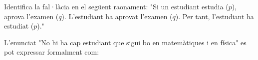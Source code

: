 \begin{enumerate}
\begin{enumerate}
\end{enumerate}
\feedback

\pregunta Identifica la fal·làcia en el següent
raonament: "Si un estudiant estudia ($p$), aprova l'examen ($q$). L'estudiant
ha aprovat l'examen ($q$). Per tant, l'estudiant ha estudiat ($p$)."

\begin{enumerate}
\end{enumerate}
\feedback

\pregunta L'enunciat "No hi ha cap estudiant que sigui bo en matemàtiques i en
física" es pot expressar formalment com:

\begin{enumerate}
\end{enumerate}
\feedback
\end{enumerate}